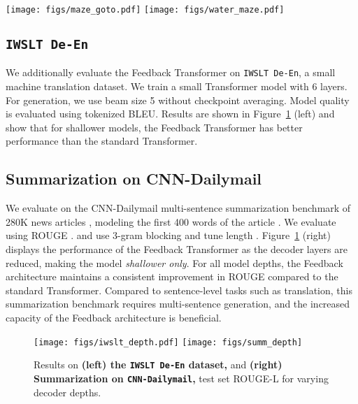 \documentclass{article} \usepackage{iclr2021_conference}
\begin{document}
\begin{figure*}[h]
    \centering
    \texttt{[image: figs/maze\_goto.pdf]}
    \hspace{0.7cm}
    \texttt{[image: figs/water\_maze.pdf]}
    \caption{Averaged cumulative reward during training on \textbf{(left)} \textbf{Maze Navigation Easy} and \textbf{(right)} \textbf{Water Maze} tasks.}
    \label{fig:water_maze}
\end{figure*}
 
\subsection{\texttt{IWSLT De-En}}

We additionally evaluate the Feedback Transformer on \texttt{IWSLT De-En}, a small machine translation dataset. We train a small Transformer model with 6 layers. For generation, we use beam size 5 without checkpoint averaging. Model quality is evaluated using tokenized BLEU. Results are shown in Figure~\ref{fig:summ_depth} (left) and show that for shallower models, the Feedback Transformer has better performance than the standard Transformer.

\subsection{Summarization on CNN-Dailymail}

We evaluate on the CNN-Dailymail multi-sentence summarization benchmark of 280K news articles \cite{hermann15}, modeling the first 400 words of the article \cite{see2017get}. 
We evaluate using ROUGE \cite{lin2004rouge}. and use 3-gram blocking and tune length \cite{fan2017controllable}. 
Figure~\ref{fig:summ_depth} (right) displays the performance of the Feedback Transformer as the decoder layers are reduced, making the model \textit{shallower only}. 
For all model depths, the Feedback architecture maintains a consistent improvement in ROUGE compared to the standard Transformer. 
Compared to sentence-level tasks such as translation, this summarization benchmark requires multi-sentence generation, and the increased capacity of the Feedback architecture is beneficial.

\begin{figure}
	\centering
    \texttt{[image: figs/iwslt\_depth.pdf]}
    \hspace{0.5cm}
	\texttt{[image: figs/summ\_depth]}
    \caption{
    Results on \textbf{(left) the \texttt{IWSLT De-En} dataset,} and
    \textbf{(right) Summarization on \texttt{CNN-Dailymail},} test set ROUGE-L for varying decoder depths.}
	\label{fig:summ_depth}
\end{figure}
\end{document}
